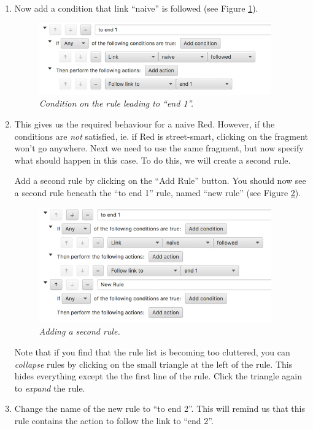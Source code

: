 \documentclass{article}
\begin{document}
\begin{enumerate}
\item Now add a condition that link ``naive'' is followed (see Figure
\ref{fig:tut2:to_end_1}).

\begin{figure}[h]
  \centering
  \includegraphics[width=10cm]{images/hypedyn-tutorial-2-figure-3}
  \caption{\textit{Condition on the rule leading to ``end 1''.}}
  \label{fig:tut2:to_end_1}
\end{figure}

\item This gives us the required behaviour for a naive Red. However, if the conditions are \textit{not} satisfied, ie. if Red is street-smart, clicking on the fragment won't go anywhere. Next we need to use the same fragment, but now specify what should happen in this case. To do this, we will create a second rule.

Add a second rule by clicking on the ``Add Rule'' button. You should now
see a second rule beneath the ``to end 1'' rule, named ``new rule''  (see Figure \ref{fig:tut2:new_rule}).

\begin{figure}[h]
  \centering
  \includegraphics[width=10cm]{images/hypedyn-tutorial-2-figure-4}
  \caption{\textit{Adding a second rule.}}
  \label{fig:tut2:new_rule}
\end{figure}

Note that if you find that the rule list is becoming too cluttered, you can \textit{collapse} rules by clicking on the small triangle at the left of the rule. This hides everything except the the first line of the rule. Click the triangle again to \textit{expand} the rule.

\item Change the name of the new rule to ``to end 2''. This will remind us that this rule contains the action to follow the link to ``end 2''.


\end{enumerate}
\end{document}
